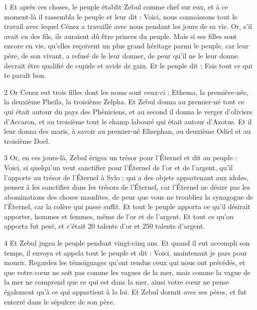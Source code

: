 
\par 1 Et après ces choses, le peuple établit Zebul comme chef sur eux, et à ce moment-là il rassembla le peuple et leur dit : Voici, nous connaissons tout le travail avec lequel Cénez a travaillé avec nous pendant les jours de sa vie. Or, s'il avait eu des fils, ils auraient dû être princes du peuple. Mais si ses filles sont encore en vie, qu'elles reçoivent un plus grand héritage parmi le peuple, car leur père, de son vivant, a refusé de le leur donner, de peur qu'il ne le leur donne. devrait être qualifié de cupide et avide de gain. Et le peuple dit : Fais tout ce qui te paraît bon.

\par 2 Or Cenez eut trois filles dont les noms sont ceux-ci : Ethema, la première-née, la deuxième Pheila, la troisième Zelpha. Et Zebul donna au premier-né tout ce qui était autour du pays des Phéniciens, et au second il donna le verger d'oliviers d'Accaron, et au troisième tout le champ labouré qui était autour d'Azotus. Et il leur donna des maris, à savoir au premier-né Elisephan, au deuxième Odiel et au troisième Doel.

\par 3 Or, en ces jours-là, Zebul érigea un trésor pour l'Éternel et dit au peuple : Voici, si quelqu'un veut sanctifier pour l'Éternel de l'or et de l'argent, qu'il l'apporte au trésor de l'Éternel à Sylo ; qui a des objets appartenant aux idoles, pensez à les sanctifier dans les trésors de l'Éternel, car l'Éternel ne désire pas les abominations des choses maudites, de peur que vous ne troubliez la synagogue de l'Éternel, car la colère qui passe suffit. Et tout le peuple apporta ce qu'il désirait apporter, hommes et femmes, même de l'or et de l'argent. Et tout ce qu'on apporta fut pesé, et c'était 20 talents d'or et 250 talents d'argent.

\par 4 Et Zebul jugea le peuple pendant vingt-cinq ans. Et quand il eut accompli son temps, il envoya et appela tout le peuple et dit : Voici, maintenant je pars pour mourir. Regardez les témoignages qu'ont rendus ceux qui nous ont précédés, et que votre cœur ne soit pas comme les vagues de la mer, mais comme la vague de la mer ne comprend que ce qui est dans la mer, ainsi votre cœur ne pense également qu’à ce qui appartient à la loi. Et Zebul dormit avec ses pères, et fut enterré dans le sépulcre de son père.



